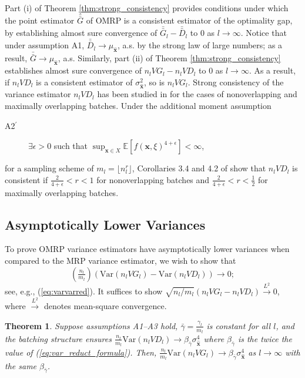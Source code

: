 \documentclass[12pt]{article}
\newtheorem{theorem}{Theorem}
\newcommand{\e}[1]{\mathbb{E} \left[ #1 \right]
}
\newcommand{\var}[1]{\mathrm{Var} \left( #1 \right)}
\newcommand{\x}{\mathbf{x}}
\newcommand{\xh}{{\hat{\x}}}
\newcommand{\gammab}{\bar{\gamma}}
\newcommand{\gb}{\bar{G}}
\newcommand{\gbb}{\bar{\gb}}
\newcommand{\db}{\bar{D}}
\newcommand{\dbb}{\bar{\db}}
\begin{document}
Part (i) of Theorem \ref{thm:strong_consistency} provides conditions under which the point estimator $\gbb$ of OMRP is a consistent estimator of the optimality gap, by establishing almost sure convergence of $\gbb_l - \dbb_l$ to $0$ as $l \rightarrow \infty$. 
Notice that under assumption A1, $\dbb_l \rightarrow \mu_\xh$, a.s. by the strong law of large numbers; as a result, $\gbb \rightarrow \mu_\xh$, a.s. 
Similarly, part (ii) of Theorem \ref{thm:strong_consistency} establishes almost sure convergence of $n_l VG_l - n_l VD_l$ to $0$ as $l \rightarrow \infty$. 
As a result, if $n_l VD_l$ is a consistent estimator of $\sigma^2_{\xh}$, so is $n_l VG_l$.  
Strong consistency of the variance estimator $n_l VD_l$ has been studied in \citep{damerdji1994strong} for the cases of nonoverlapping and maximally overlapping batches.  
Under the additional moment assumption
\begin{description}
	\item[A2$^\prime$]  $\exists \epsilon > 0$ such that $\sup_{\x \in X} \e{f(\x,\xi)^{4+\epsilon}} < \infty$,
\end{description}
for a sampling scheme of $m_l = \lfloor n_l^r \rfloor$, Corollaries 3.4 and 4.2 of \citep{damerdji1994strong} show that $n_l VD_l$ is consistent if $\tfrac{2}{4+\epsilon} < r < 1$ for nonoverlapping batches and $\tfrac{2}{4+\epsilon} < r < \tfrac{1}{2}$ for maximally overlapping batches. 


\subsection{Asymptotically Lower Variances}
\label{ssec:var_reduct}

 
To prove OMRP variance estimators have asymptotically lower variances when compared to the MRP variance estimator, we wish to show that 
$$
(\tfrac{n_l}{m_l}) \left( \var{n_l VG_l} - \var{n_l VD_l} \right) \rightarrow 0;
$$
see, e.g., (\ref{eq:varvarred}).
It suffices to show $\sqrt{{n_l}/{m_l}} \left( n_l VG_l - n_l VD_l \right) \xrightarrow{L^2} 0$, where $\xrightarrow{L^2}$ denotes mean-square convergence.


\begin{theorem} \label{thm:varvar_conv}
	Suppose assumptions A1--A3 hold, $\gammab = \frac{\gamma_l}{m_l}$ is constant for all $l$, and the batching structure ensures  $\frac{n_l}{m_l}\var{n_l VD_l} \rightarrow \beta_{\gammab} \sigma^4_{\xh}$ where $\beta_{\gammab}$ is the twice the value of (\ref{eq:var_reduct_formula}). 
        Then, $\frac{n_l}{m_l}\var{n_l VG_l} \rightarrow \beta_{\gammab} \sigma^4_{\xh}$ as $l \rightarrow \infty$ with the same $\beta_{\gammab}$. 
\end{theorem}
\end{document}
